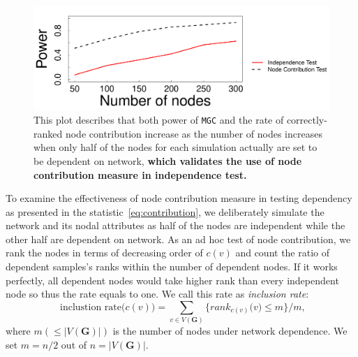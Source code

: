 \documentclass[11pt]{article}
\theoremstyle{definition}
\begin{document}
\begin{figure}[h]
	\centering
	\includegraphics[width=\linewidth]{nodecontri.pdf}
	\caption{This plot describes that both power of \texttt{MGC} and the rate of correctly-ranked node contribution increase as the number of nodes increases when only half of the nodes for each simulation actually are set to be dependent on network, \textbf{which validates the use of node contribution measure in independence test.}}
	\label{fig:contribution}
\end{figure}
To examine the effectiveness of node contribution measure in testing dependency as presented in the statistic~\ref{eq:contribution}, we deliberately simulate the network and its nodal attributes as half of the nodes are independent while the other half are dependent on network. As an ad hoc test of node contribution, we rank the nodes in terms of decreasing order of $c(v)$ and count the ratio of dependent samples's ranks within the number of dependent nodes. If it works perfectly, all dependent nodes would take higher rank than every independent node so thus the rate equals to one. We call this rate as \textit{inclusion rate}:
\begin{equation}
\mbox{ inclustion rate}\big(  c(v) \big) = \sum\limits_{v \in V(\mathbf{G})} \big\{  rank_{c(v)}\big(  v \big)  \leq  m  \big\}   /  m,
\label{eq:inclusion_rate}
\end{equation}
where $m (\leq |V(\mathbf{G})|)$ is the number of nodes under network dependence. We set $m=n/2$ out of $n = |V(\mathbf{G})|$.


\end{document}
